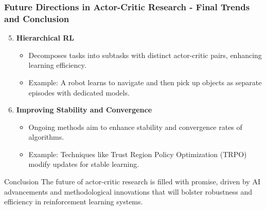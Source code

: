 \documentclass[aspectratio=169]{beamer}
\begin{document}
\begin{frame}[fragile]
    \frametitle{Future Directions in Actor-Critic Research - Final Trends and Conclusion}
    \begin{enumerate}
        \setcounter{enumi}{4} %
        \item \textbf{Hierarchical RL}
            \begin{itemize}
                \item Decomposes tasks into subtasks with distinct actor-critic pairs, enhancing learning efficiency.
                \item Example: A robot learns to navigate and then pick up objects as separate episodes with dedicated models.
            \end{itemize}
        \item \textbf{Improving Stability and Convergence}
            \begin{itemize}
                \item Ongoing methods aim to enhance stability and convergence rates of algorithms.
                \item Example: Techniques like Trust Region Policy Optimization (TRPO) modify updates for stable learning.
            \end{itemize}
    \end{enumerate}
    
    \begin{block}{Conclusion}
        The future of actor-critic research is filled with promise, driven by AI advancements and methodological innovations that will bolster robustness and efficiency in reinforcement learning systems.
    \end{block}
\end{frame}
\end{document}
